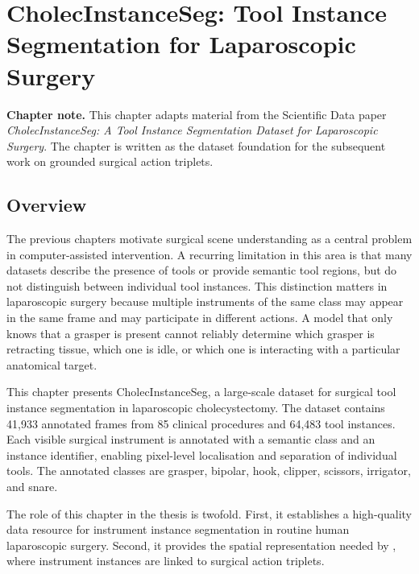 \chapter{CholecInstanceSeg: Tool Instance Segmentation for Laparoscopic Surgery}
\label{chap:cholecinstanceseg}
\minitoc

\begin{center}
\begin{minipage}[b]{0.9\linewidth}
\small
\textbf{Chapter note.}
This chapter adapts material from the Scientific Data paper \emph{CholecInstanceSeg: A Tool Instance Segmentation Dataset for Laparoscopic Surgery}. The chapter is written as the dataset foundation for the subsequent work on grounded surgical action triplets.
\end{minipage}
\end{center}

\section{Overview}
\label{sec:cholecinstanceseg-overview}

The previous chapters motivate surgical scene understanding as a central problem in computer-assisted intervention. A recurring limitation in this area is that many datasets describe the presence of tools or provide semantic tool regions, but do not distinguish between individual tool instances. This distinction matters in laparoscopic surgery because multiple instruments of the same class may appear in the same frame and may participate in different actions. A model that only knows that a grasper is present cannot reliably determine which grasper is retracting tissue, which one is idle, or which one is interacting with a particular anatomical target.

This chapter presents CholecInstanceSeg, a large-scale dataset for surgical tool instance segmentation in laparoscopic cholecystectomy. The dataset contains 41,933 annotated frames from 85 clinical procedures and 64,483 tool instances. Each visible surgical instrument is annotated with a semantic class and an instance identifier, enabling pixel-level localisation and separation of individual tools. The annotated classes are grasper, bipolar, hook, clipper, scissors, irrigator, and snare.

The role of this chapter in the thesis is twofold. First, it establishes a high-quality data resource for instrument instance segmentation in routine human laparoscopic surgery. Second, it provides the spatial representation needed by , where instrument instances are linked to surgical action triplets.

